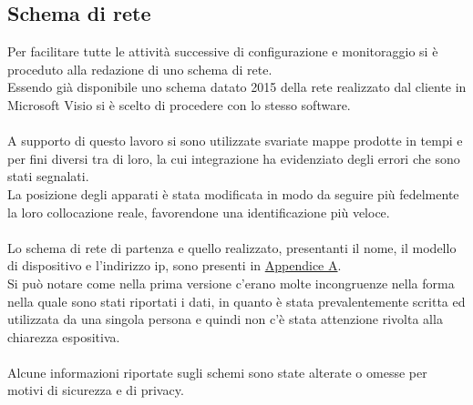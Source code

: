 \documentclass[Realizzazione.tex]{subfiles}
\begin{document}
\subsection{Schema di rete}
Per facilitare tutte le attività successive di configurazione e monitoraggio si è proceduto alla redazione di uno schema di rete. \\
Essendo già disponibile uno schema datato 2015 della rete realizzato dal cliente in Microsoft Visio si è scelto di procedere con lo stesso software. \\\\
A supporto di questo lavoro si sono utilizzate svariate mappe prodotte in tempi e per fini diversi tra di loro, la cui integrazione ha evidenziato degli errori che sono stati segnalati. \\
La posizione degli apparati è stata modificata in modo da seguire più fedelmente la loro collocazione reale, favorendone una identificazione più veloce. \\\\
Lo schema di rete di partenza e quello realizzato, presentanti il nome, il modello di dispositivo e l'indirizzo ip, sono presenti in \hyperref[sec:Appendice A]{Appendice A}.\\
Si può notare come nella prima versione c'erano molte incongruenze nella forma nella quale sono stati riportati i dati, in quanto è stata prevalentemente scritta ed utilizzata da una singola persona e quindi non c'è stata attenzione rivolta alla chiarezza espositiva. \\\\
Alcune informazioni riportate sugli schemi sono state alterate o omesse per motivi di sicurezza e di privacy. \\
\end{document}
